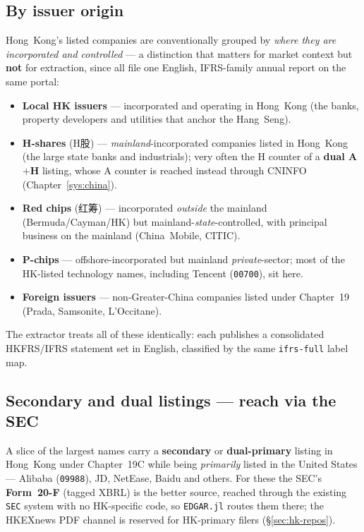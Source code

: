 \documentclass[11pt,a4paper]{report}
\newcommand{\cncjk}[2]{{\cjkCNfont #1}}
\begin{document}
\subsection{By issuer origin}
Hong~Kong's listed companies are conventionally grouped by \emph{where they are incorporated and controlled}
--- a distinction that matters for market context but \textbf{not} for extraction, since all file one
English, IFRS-family annual report on the same portal:
\begin{itemize}[nosep]
  \item \textbf{Local HK issuers} --- incorporated and operating in Hong~Kong (the banks, property developers
    and utilities that anchor the Hang~Seng).
  \item \textbf{H-shares} (\cncjk{H股}{}) --- \emph{mainland}-incorporated companies listed in Hong~Kong (the
    large state banks and industrials); very often the H counter of a \textbf{dual A$+$H} listing, whose A
    counter is reached instead through CNINFO (Chapter~\ref{sys:china}).
  \item \textbf{Red chips} (\cncjk{红筹}{}) --- incorporated \emph{outside} the mainland (Bermuda/Cayman/HK)
    but mainland-\emph{state}-controlled, with principal business on the mainland (China~Mobile, CITIC).
  \item \textbf{P-chips} --- offshore-incorporated but mainland \emph{private}-sector; most of the HK-listed
    technology names, including Tencent (\texttt{00700}), sit here.
  \item \textbf{Foreign issuers} --- non-Greater-China companies listed under Chapter~19 (Prada, Samsonite,
    L'Occitane).
\end{itemize}
The extractor treats all of these identically: each publishes a consolidated HKFRS/IFRS statement set in
English, classified by the same \texttt{ifrs-full} label map.

\subsection{Secondary and dual listings --- reach via the SEC}
A slice of the largest names carry a \textbf{secondary} or \textbf{dual-primary} listing in Hong~Kong under
Chapter~19C while being \emph{primarily} listed in the United States --- Alibaba (\texttt{09988}), JD,
NetEase, Baidu and others. For these the SEC's \textbf{Form~20-F} (tagged XBRL) is the better source, reached
through the existing \texttt{SEC} system with no HK-specific code, so \texttt{EDGAR.jl} routes them there; the
HKEXnews PDF channel is reserved for HK-primary filers (\S\ref{sec:hk-repos}).
\end{document}

